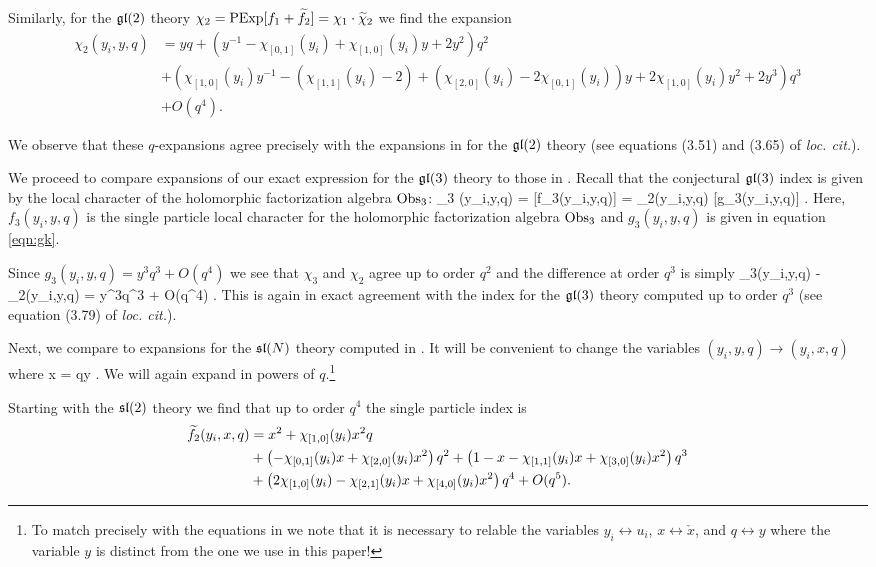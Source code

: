 Similarly, for the $\mathfrak{gl}(2)$ theory $\chi_2 = \text{PExp}[f_1 + \widetilde f_2] = \chi_1 \cdot \widetilde \chi_2$ we find the expansion
\begin{align*}
\chi_2 (y_i,y,q) & = y q + \left(y^{-1} - \chi_{[0,1]}(y_i) + \chi_{[1,0]}(y_i) y + 2y^2 \right) q^2 \\ 
& + \left( \chi_{[1,0]}(y_i) y^{-1} - (\chi_{[1,1]}(y_i)-2) + (\chi_{[2,0]}(y_i) - 2 \chi_{[0,1]}(y_i)) y + 2 \chi_{[1,0]}(y_i) y^2 + 2y^3\right) q^3 \\ & + O(q^4) .
\end{align*}

We observe that these $q$-expansions agree precisely with the expansions in \cite{Kim:2013nva} for the $\mathfrak{gl}(2)$ theory  
(see equations (3.51) and (3.65) of \textit{loc. cit.}).

\parsec

We proceed to compare expansions of our exact expression for the $\mathfrak{gl}(3)$ theory to those in \cite{Kim:2013nva}. 
Recall that the conjectural $\mathfrak{gl}(3)$ index is given by the local character of the holomorphic factorization algebra $\operatorname{Obs}_3$:
\beqn
\chi_3 (y_i,y,q) = [f_3(y_i,y,q)] = \chi_2(y_i,y,q) \cdot {}[g_3(y_i,y,q)]  .
\eeqn
Here, $f_3(y_i,y,q)$ is the single particle local character for the holomorphic factorization algebra $\operatorname{Obs}_3$ and $g_3(y_i,y,q)$ is given in equation \eqref{eqn:gk}. 

Since $g_3(y_i,y,q) = y^3 q^3 + O(q^4)$ we see that $\chi_3$ and $\chi_2$ agree up to order $q^2$ and the difference at order $q^3$ is simply
\beqn
\chi_3(y_i,y,q) - \chi_2(y_i,y,q) = y^3q^3 + O(q^4) .
\eeqn
This is again in exact agreement with the index for the $\mathfrak{gl}(3)$ theory computed \cite{Kim:2013nva} up to order $q^3$ (see equation (3.79) of \textit{loc. cit.}). 

\parsec

Next, we compare to expansions for the $\mathfrak{sl}(N)$ theory computed in \cite{Imamura}.
It will be convenient to change the variables $(y_i, y, q) \to (y_i,x,q)$ where 
\beqn
x = qy .
\eeqn 
We will again expand in powers of $q$.\footnote{To match precisely with the equations in \cite{Imamura} we note that it is necessary to relable the variables $y_i \leftrightarrow u_i$, $x \leftrightarrow \check{x}$, and $q \leftrightarrow y$ where the variable $y$ is distinct from the one we use in this paper!}

Starting with the $\mathfrak{sl}(2)$ theory we find that up to order $q^4$ the single particle index is
\begin{align*}
\widetilde f_2 (y_i,x,q) & = x^2 + \chi_{[1,0]}(y_i) x^2 q \\
& + \left(-\chi_{[0,1]}(y_i) x + \chi_{[2,0]}(y_i) x^2 \right) q^2 +  \left(1-x-\chi_{[1,1]}(y_i) x + \chi_{[3,0]}(y_i) x^2 \right) q^3 \\
& + \left(2 \chi_{[1,0]}(y_i) - \chi_{[2,1]}(y_i) x + \chi_{[4,0]}(y_i)x^2 \right)q^4 + O(q^5) .
\end{align*}

